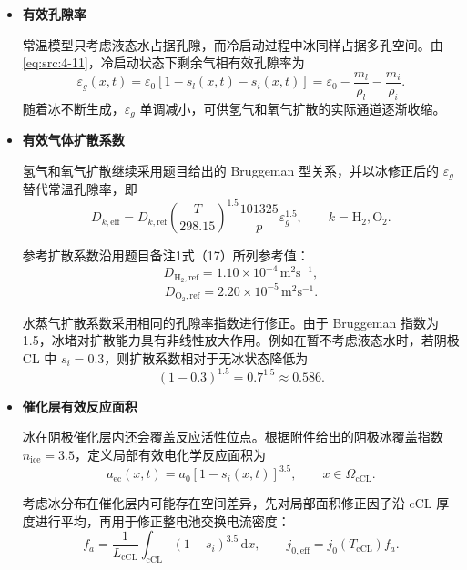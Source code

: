\documentclass[bwprint]{gmcmthesis}
\numberwithin{equation}{section}
\numberwithin{figure}{section}
\begin{document}
\begin{itemize}
\renewcommand{\labelitemi}{$\blacktriangleright$}
\item \textbf {有效孔隙率}

常温模型只考虑液态水占据孔隙，而冷启动过程中冰同样占据多孔空间。由\eqref{eq:src:4-11}，冷启动状态下剩余气相有效孔隙率为
\begin{equation}
\varepsilon_g(x,t) = \varepsilon_0 [1 - s_l(x,t) - s_i(x,t)] = \varepsilon_0 - \frac{m_l}{\rho_l} - \frac{m_i}{\rho_i}. \label{eq:src:4-44}
\end{equation}
随着冰不断生成，\(\varepsilon_g\) 单调减小，可供氢气和氧气扩散的实际通道逐渐收缩。


\item \textbf {有效气体扩散系数}

氢气和氧气扩散继续采用题目给出的 Bruggeman 型关系，并以冰修正后的 \(\varepsilon_g\) 替代常温孔隙率，即
\begin{equation}
D_{k,\text{eff}} = D_{k,\text{ref}} \left( \frac{T}{298.15} \right)^{1.5} \frac{101325}{p} \varepsilon_g^{1.5}, \qquad k = \text{H}_2, \text{O}_2. \label{eq:src:4-45}
\end{equation}


参考扩散系数沿用题目备注1式（17）所列参考值：
\[
D_{\text{H}_2,\text{ref}} = 1.10 \times 10^{-4} \, \text{m}^2\text{s}^{-1},
\]
\[
D_{\text{O}_2,\text{ref}} = 2.20 \times 10^{-5} \, \text{m}^2\text{s}^{-1}.
\]

 水蒸气扩散系数采用相同的孔隙率指数进行修正。由于 Bruggeman 指数为 1.5，冰堵对扩散能力具有非线性放大作用。例如在暂不考虑液态水时，若阴极 CL 中 \(s_i = 0.3\)，则扩散系数相对于无冰状态降低为
\[
(1 - 0.3)^{1.5} = 0.7^{1.5} \approx 0.586.
\]

\item \textbf {催化层有效反应面积}

冰在阴极催化层内还会覆盖反应活性位点。根据附件给出的阴极冰覆盖指数 \(n_{\text{ice}} = 3.5\)，定义局部有效电化学反应面积为
\begin{equation}
a_{\text{ec}}(x,t) = a_0[1 - s_i(x,t)]^{3.5}, \qquad x \in \Omega_{\text{cCL}}. \label{eq:src:4-46a}
\end{equation}

 考虑冰分布在催化层内可能存在空间差异，先对局部面积修正因子沿 cCL 厚度进行平均，再用于修正整电池交换电流密度：
\begin{equation}
f_a = \frac{1}{L_{\text{cCL}}} \int_{\text{cCL}} (1 - s_i)^{3.5} \, \mathrm{d}x, \qquad j_{0,\text{eff}} = j_0(T_{\text{cCL}}) f_a. \label{eq:src:4-47}
\end{equation}


\end{itemize}
\end{document}
